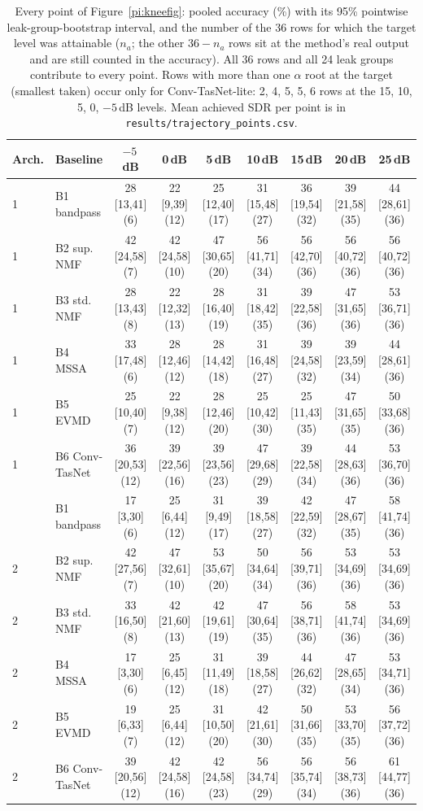 \documentclass[journal]{IEEEtran}
\begin{document}
\begin{table}[t]
\centering
\caption{Every point of Figure~\ref{pi:kneefig}: pooled accuracy (\%) with its 95\% pointwise leak-group-bootstrap interval, and the number of the 36 rows for which the target level was attainable ($n_a$; the other $36-n_a$ rows sit at the method's real output and are still counted in the accuracy). All 36 rows and all 24 leak groups contribute to every point. Rows with more than one $\alpha$ root at the target (smallest taken) occur only for Conv-TasNet-lite: 2, 4, 5, 5, 6 rows at the 15, 10, 5, 0, $-5$\,dB levels. Mean achieved SDR per point is in \texttt{results/trajectory\_points.csv}.}
\label{pi:points}
\scriptsize\setlength{\tabcolsep}{2.5pt}
\begin{tabular}{@{}llccccccc@{}}
\toprule
Arch. & Baseline & $-5$\,dB & 0\,dB & 5\,dB & 10\,dB & 15\,dB & 20\,dB & 25\,dB \\
\midrule
1 & B1 bandpass & 28 [13,41] (6) & 22 [9,39] (12) & 25 [12,40] (17) & 31 [15,48] (27) & 36 [19,54] (32) & 39 [21,58] (35) & 44 [28,61] (36) \\
1 & B2 sup. NMF & 42 [24,58] (7) & 42 [24,58] (10) & 47 [30,65] (20) & 56 [41,71] (34) & 56 [42,70] (36) & 56 [40,72] (36) & 56 [40,72] (36) \\
1 & B3 std. NMF & 28 [13,43] (8) & 22 [12,32] (13) & 28 [16,40] (19) & 31 [18,42] (35) & 39 [22,58] (36) & 47 [31,65] (36) & 53 [36,71] (36) \\
1 & B4 MSSA & 33 [17,48] (6) & 28 [12,46] (12) & 28 [14,42] (18) & 31 [16,48] (27) & 39 [24,58] (32) & 39 [23,59] (34) & 44 [28,61] (36) \\
1 & B5 EVMD & 25 [10,40] (7) & 22 [9,38] (12) & 28 [12,46] (20) & 25 [10,42] (30) & 25 [11,43] (35) & 47 [31,65] (35) & 50 [33,68] (36) \\
1 & B6 Conv-TasNet & 36 [20,53] (12) & 39 [22,56] (16) & 39 [23,56] (23) & 47 [29,68] (29) & 39 [22,58] (34) & 44 [28,63] (36) & 53 [36,70] (36) \\
\addlinespace
2 & B1 bandpass & 17 [3,30] (6) & 25 [6,44] (12) & 31 [9,49] (17) & 39 [18,58] (27) & 42 [22,59] (32) & 47 [28,67] (35) & 58 [41,74] (36) \\
2 & B2 sup. NMF & 42 [27,56] (7) & 47 [32,61] (10) & 53 [35,67] (20) & 50 [34,64] (34) & 56 [39,71] (36) & 53 [34,69] (36) & 53 [34,69] (36) \\
2 & B3 std. NMF & 33 [16,50] (8) & 42 [21,60] (13) & 42 [19,61] (19) & 47 [30,64] (35) & 56 [38,71] (36) & 58 [41,74] (36) & 53 [34,69] (36) \\
2 & B4 MSSA & 17 [3,30] (6) & 25 [6,45] (12) & 31 [11,49] (18) & 39 [18,58] (27) & 44 [26,62] (32) & 47 [28,65] (34) & 53 [34,71] (36) \\
2 & B5 EVMD & 19 [6,33] (7) & 25 [6,44] (12) & 31 [10,50] (20) & 42 [21,61] (30) & 50 [31,66] (35) & 53 [33,70] (35) & 56 [37,72] (36) \\
2 & B6 Conv-TasNet & 39 [20,56] (12) & 42 [24,58] (16) & 42 [24,58] (23) & 56 [34,74] (29) & 56 [35,74] (34) & 56 [38,73] (36) & 61 [44,77] (36) \\
\bottomrule
\end{tabular}
\end{table}
\end{document}
